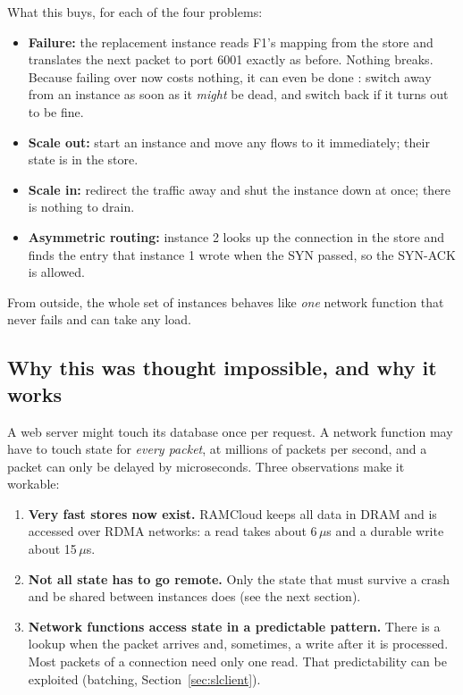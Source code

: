 What this buys, for each of the four problems:
\begin{itemize}
  \item \textbf{Failure:} the replacement instance reads F1's mapping from the store and translates the next packet to port 6001 exactly
        as before. Nothing breaks. Because failing over now costs nothing, it can even be done : switch away from an
        instance as soon as it \emph{might} be dead, and switch back if it turns out to be fine.
  \item \textbf{Scale out:} start an instance and move any flows to it immediately; their state is in the store.
  \item \textbf{Scale in:} redirect the traffic away and shut the instance down at once; there is nothing to drain.
  \item \textbf{Asymmetric routing:} instance 2 looks up the connection in the store and finds the entry that instance 1 wrote when the SYN
        passed, so the SYN-ACK is allowed.
\end{itemize}
From outside, the whole set of instances behaves like \emph{one} network function that never fails and can take any load.

\subsection{Why this was thought impossible, and why it works}
A web server might touch its database once per request. A network function may have to touch state for \emph{every packet}, at millions
of packets per second, and a packet can only be delayed by microseconds. Three observations make it workable:
\begin{enumerate}
  \item \textbf{Very fast stores now exist.} RAMCloud keeps all data in DRAM and is accessed over RDMA networks: a read takes about
        6\,$\mu$s and a durable write about 15\,$\mu$s.
  \item \textbf{Not all state has to go remote.} Only the state that must survive a crash and be shared between instances does (see the next section).
  \item \textbf{Network functions access state in a predictable pattern.} There is a lookup when the packet arrives and, sometimes, a write after it
        is processed. Most packets of a connection need only one read. That predictability can be exploited (batching, Section~\ref{sec:slclient}).
\end{enumerate}


